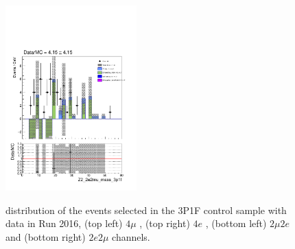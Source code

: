 \begin{figure}[!htb]
\begin{center}
    {\includegraphics [width=0.45\textwidth] {Figures/RedBkg/3P1F/Z2_2e2mu_mass_3p1f.pdf}} \\
    \caption{
         distribution of the events selected in the 3P1F control sample with data in Run 2016, 
        (top left)  $4\mu$ , (top right) $4e$ , (bottom left)  $2\mu2e$ and (bottom right)  $2e2\mu$ channels.
    }
\label{fig:3P1F_dataMC}
\end{center}
\end{figure}

